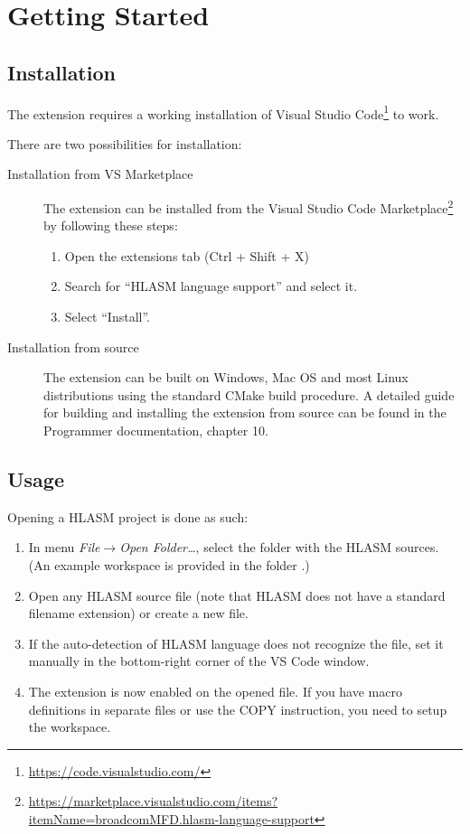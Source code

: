 \section{Getting Started}
\label{sec:start}

\subsection{Installation}

The extension requires a working installation of Visual Studio Code\footnote{\url{https://code.visualstudio.com/}} to work.

There are two possibilities for installation:
\begin{description}
	\item[Installation from VS Marketplace]
	The extension can be installed from the Visual Studio Code Marketplace\footnote{\url{https://marketplace.visualstudio.com/items?itemName=broadcomMFD.hlasm-language-support}} by following these steps:
	\begin{enumerate}
		\item Open the extensions tab (Ctrl + Shift + X)
		\item Search for ``HLASM language support'' and select it.
		\item Select ``Install''.
	\end{enumerate}
	\item[Installation from source]
	The extension can be built on Windows, Mac OS and most Linux distributions using the standard CMake build procedure. A detailed guide for building and installing the extension from source can be found in the Programmer documentation, chapter 10.
\end{description}

\subsection{Usage}

Opening a HLASM project is done as such:

\begin{enumerate}
	\item In menu \emph{File}$\to$\emph{Open Folder\dots}, select the folder with the HLASM sources.
		(An example workspace is provided in the folder .)
	\item Open any HLASM source file (note that HLASM does not have a standard filename extension) or create a new file.
	\item If the auto-detection of HLASM language does not recognize the file, set it manually in the bottom-right corner of the VS Code window.  
	\item The extension is now enabled on the opened file. If you have macro definitions in separate files or use the COPY instruction, you need to setup the workspace.
\end{enumerate}

